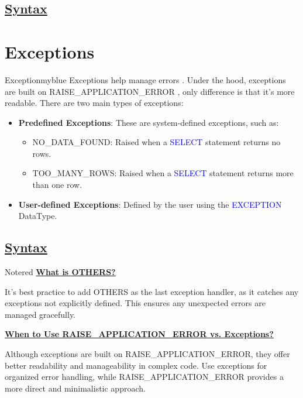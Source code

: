 \newpage
\subsection*{\underline{Syntax}}





\vspace{0.5cm}

\section{Exceptions}
\begin{prettyBox}{Exception}{myblue}
Exceptions help manage errors . Under
the hood, exceptions are built on RAISE\_APPLICATION\_ERROR ,  only difference is that it's more readable. There are two main types of exceptions:
\begin{itemize}
    \item \textbf{Predefined Exceptions}: These are system-defined exceptions, such as:
        \begin{itemize}
            \item NO\_DATA\_FOUND: Raised when a \textcolor{blue}{SELECT} statement returns no rows.
            \item TOO\_MANY\_ROWS: Raised when a \textcolor{blue}{SELECT} statement returns more than one row.
        \end{itemize}
    \item \textbf{User-defined Exceptions}: Defined by the user using the \textcolor{blue}{EXCEPTION} DataType.
\end{itemize}
\end{prettyBox}

\newpage
\subsection*{\underline{Syntax}}







\vspace{0.5cm}
\begin{prettyBox}{Note}{red}
\textbf{\underline{What is OTHERS?}}

\vspace{0.15cm}
It’s best practice to add OTHERS as the last exception handler, as it catches any exceptions not explicitly
defined. This ensures any unexpected errors are managed gracefully.

\vspace{0.25cm}

\textbf{\underline{When to Use RAISE\_APPLICATION\_ERROR vs. Exceptions?}}

\vspace{0.15cm}
Although exceptions are built on RAISE\_APPLICATION\_ERROR, they offer better readability and manageability
in complex code. Use exceptions for organized error handling, while RAISE\_APPLICATION\_ERROR provides a more
direct and minimalistic approach.
\end{prettyBox}

